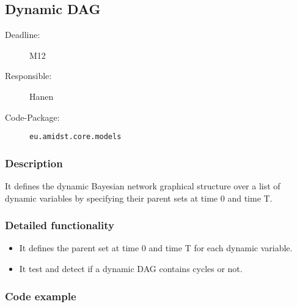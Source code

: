 \newpage
\subsection{Dynamic DAG}
\label{DynamicDAG:ID}

\begin{description}
\item[Deadline:] M12
\item[Responsible:] Hanen
\item[Code-Package:] \texttt{eu.amidst.core.models}
\end{description}

\subsubsection*{Description}

It defines the dynamic Bayesian network graphical structure over a list of dynamic variables by specifying their parent sets at time 0 and time T.

\subsubsection*{Detailed functionality}

\begin{itemize}
\item It defines the parent set at time 0 and time T for each dynamic variable.
\item It test and detect if a dynamic DAG contains cycles or not.
\end{itemize}

\subsubsection*{Code example}

